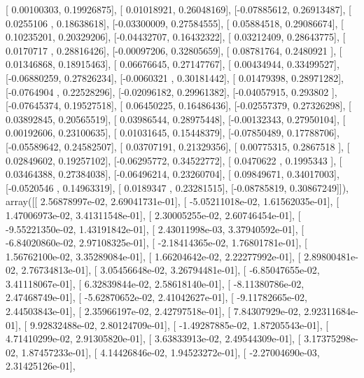 \documentclass{article}
\begin{document}
       [ 0.00100303,  0.19926875],
       [ 0.01018921,  0.26048169],
       [-0.07885612,  0.26913487],
       [ 0.0255106 ,  0.18638618],
       [-0.03300009,  0.27584555],
       [ 0.05884518,  0.29086674],
       [ 0.10235201,  0.20329206],
       [-0.04432707,  0.16432322],
       [ 0.03212409,  0.28643775],
       [ 0.0170717 ,  0.28816426],
       [-0.00097206,  0.32805659],
       [ 0.08781764,  0.2480921 ],
       [ 0.01346868,  0.18915463],
       [ 0.06676645,  0.27147767],
       [ 0.00434944,  0.33499527],
       [-0.06880259,  0.27826234],
       [-0.0060321 ,  0.30181442],
       [ 0.01479398,  0.28971282],
       [-0.0764904 ,  0.22528296],
       [-0.02096182,  0.29961382],
       [-0.04057915,  0.293802  ],
       [-0.07645374,  0.19527518],
       [ 0.06450225,  0.16486436],
       [-0.02557379,  0.27326298],
       [ 0.03892845,  0.20565519],
       [ 0.03986544,  0.28975448],
       [-0.00132343,  0.27950104],
       [ 0.00192606,  0.23100635],
       [ 0.01031645,  0.15448379],
       [-0.07850489,  0.17788706],
       [-0.05589642,  0.24582507],
       [ 0.03707191,  0.21329356],
       [ 0.00775315,  0.2867518 ],
       [ 0.02849602,  0.19257102],
       [-0.06295772,  0.34522772],
       [ 0.0470622 ,  0.1995343 ],
       [ 0.03464388,  0.27384038],
       [-0.06496214,  0.23260704],
       [ 0.09849671,  0.34017003],
       [-0.0520546 ,  0.14963319],
       [ 0.0189347 ,  0.23281515],
       [-0.08785819,  0.30867249]]), array([[  2.56878997e-02,   2.69041731e-01],
       [ -5.05211018e-02,   1.61562035e-01],
       [  1.47006973e-02,   3.41311548e-01],
       [  2.30005255e-02,   2.60746454e-01],
       [ -9.55221350e-02,   1.43191842e-01],
       [  2.43011998e-03,   3.37940592e-01],
       [ -6.84020860e-02,   2.97108325e-01],
       [ -2.18414365e-02,   1.76801781e-01],
       [  1.56762100e-02,   3.35289084e-01],
       [  1.66204642e-02,   2.22277992e-01],
       [  2.89800481e-02,   2.76734813e-01],
       [  3.05456648e-02,   3.26794481e-01],
       [ -6.85047655e-02,   3.41118067e-01],
       [  6.32839844e-02,   2.58618140e-01],
       [ -8.11380786e-02,   2.47468749e-01],
       [ -5.62870652e-02,   2.41042627e-01],
       [ -9.11782665e-02,   2.44503843e-01],
       [  2.35966197e-02,   2.42797518e-01],
       [  7.84307929e-02,   2.92311684e-01],
       [  9.92832488e-02,   2.80124709e-01],
       [ -1.49287885e-02,   1.87205543e-01],
       [  4.71410299e-02,   2.91305820e-01],
       [  3.63833913e-02,   2.49544309e-01],
       [  3.17375298e-02,   1.87457233e-01],
       [  4.14426846e-02,   1.94523272e-01],
       [ -2.27004690e-03,   2.31425126e-01],
\end{document}
